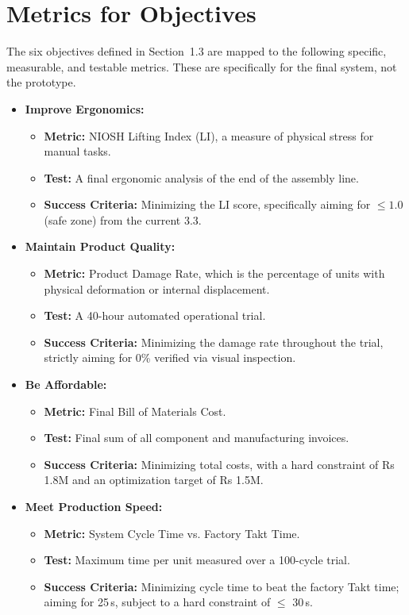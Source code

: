 \section{Metrics for Objectives}

The six objectives defined in Section~1.3 are mapped to the following specific, measurable, and testable metrics. These are specifically for the final system, not the prototype.

\begin{itemize}

    \item \textbf{Improve Ergonomics:}
    \begin{itemize}
        \item \textbf{Metric:} NIOSH Lifting Index (LI), a measure of physical stress for manual tasks.
        \item \textbf{Test:} A final ergonomic analysis of the end of the assembly line.
        \item \textbf{Success Criteria:} Minimizing the LI score, specifically aiming for $\le 1.0$ (safe zone) from the current 3.3.
    \end{itemize}

    \item \textbf{Maintain Product Quality:}
    \begin{itemize}
        \item \textbf{Metric:} Product Damage Rate, which is the percentage of units with physical deformation or internal displacement.
        \item \textbf{Test:} A 40-hour automated operational trial.
        \item \textbf{Success Criteria:} Minimizing the damage rate throughout the trial, strictly aiming for 0\% verified via visual inspection.
    \end{itemize}

    \item \textbf{Be Affordable:}
    \begin{itemize}
        \item \textbf{Metric:} Final Bill of Materials Cost.
        \item \textbf{Test:} Final sum of all component and manufacturing invoices.
        \item \textbf{Success Criteria:} Minimizing total costs, with a hard constraint of Rs 1.8M and an optimization target of Rs 1.5M.
    \end{itemize}

    \item \textbf{Meet Production Speed:}
    \begin{itemize}
        \item \textbf{Metric:} System Cycle Time vs. Factory Takt Time.
        \item \textbf{Test:} Maximum time per unit measured over a 100-cycle trial.
        \item \textbf{Success Criteria:} Minimizing cycle time to beat the factory Takt time; aiming for 25\,s, subject to a hard constraint of $\le$ 30\,s.
    \end{itemize}


\end{itemize}
